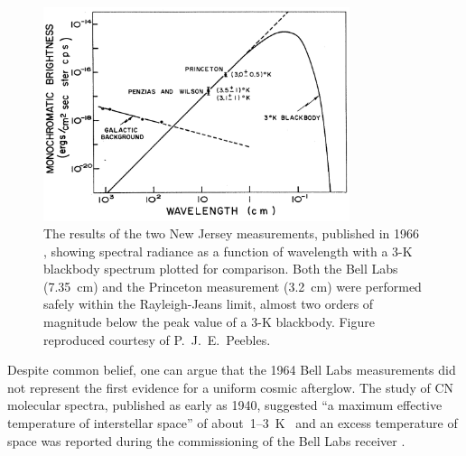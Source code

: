 \documentclass[a4paper,12pt]{article}
\theoremstyle{remark}
\renewcommand{\=}[1]{\stackrel{#1}{=}} %
\theoremstyle{plain}
\theoremstyle{definition}
\begin{document}
\begin{figure}[t]
\begin{center}
    \includegraphics*[angle=0,width=0.8\textwidth]{img/peebles_plot.png}
    \caption[The spectrum of the CMB]{The results of the two New Jersey measurements, published in 1966 \cite{Roll1966}, showing spectral radiance as a function of wavelength with a 3-K blackbody spectrum plotted for comparison. Both the Bell Labs (7.35~cm) and the Princeton measurement (3.2~cm) were performed safely within the Rayleigh-Jeans limit, almost two orders of magnitude below the peak value of a 3-K blackbody. Figure reproduced courtesy of P.~J.~E.~Peebles.}
\label{fig:peebles_plot}
\end{center}
\end{figure}

Despite common belief, one can argue that the 1964 Bell Labs measurements did not represent the first evidence for a uniform cosmic afterglow. The study of CN molecular spectra, published as early as 1940, suggested ``a maximum effective temperature of interstellar space'' of about~1--3~K~\cite{McKellar1940,Herzberg1950} and an excess temperature of space was reported during the commissioning of the Bell Labs receiver \cite{Ohm1961, 
JonesThesis}. 
\end{document}
